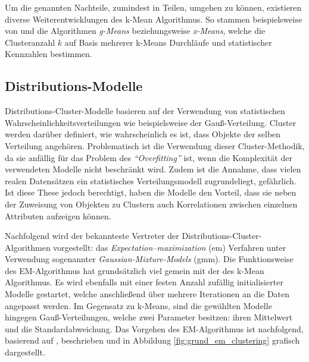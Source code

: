 Um die genannten Nachteile, zumindest in Teilen, umgehen zu können, existieren diverse Weiterentwicklungen des k-Mean
Algorithmus. So stammen beispielsweise von \cite[]{Hamerly} und \cite[]{Pelleg} die Algorithmen \textit{g-Means}
beziehungsweise \textit{x-Means}, welche die Clusteranzahl $k$ auf Basis mehrerer k-Means Durchläufe und
statistischer Kennzahlen bestimmen.

\subsection{Distributions-Modelle}
\label{sec:grund_distribution_clustering}

Distributions-Cluster-Modelle basieren auf der Verwendung von statistischen Wahrscheinlichkeitsverteilungen wie
beispielsweise der Gauß-Verteilung. Cluster werden darüber definiert, wie wahrscheinlich es ist, dass Objekte
der selben Verteilung angehören. Problematisch ist die Verwendung dieser Cluster-Methodik, da sie anfällig für
das Problem des \textit{``Overfitting''} ist, wenn die Komplexität der verwendeten Modelle nicht beschränkt wird.
Zudem ist die Annahme, dass vielen realen Datensätzen ein statistisches Verteilungsmodell zugrundeliegt, gefährlich.
Ist diese These jedoch berechtigt, haben die Modelle den Vorteil, dass sie neben der Zuweisung von Objekten zu Clustern
auch Korrelationen zwischen einzelnen Attributen aufzeigen können. \cite[]{AndersDrachen2014}

Nachfolgend wird der bekannteste Vertreter der Distributions-Cluster-Algorithmen vorgestellt:
das \textit{Expectation–maximization} (\acrshort*{em}) Verfahren unter Verwendung sogenannter \textit{Gaussian-Mixture-Models} (\acrshort*{gmm}).
Die Funktionsweise des EM-Algorithmus hat grundsätzlich viel gemein mit der des k-Mean Algorithmus.
Es wird ebenfalls mit einer festen Anzahl zufällig initialisierter Modelle gestartet, welche anschließend über mehrere Iterationen
an die Daten angepasst werden. Im Gegensatz zu k-Means, sind die gewählten Modelle hingegen Gauß-Verteilungen,
welche zwei Parameter besitzen: ihren Mittelwert und die Standardabweichung.
Das Vorgehen des EM-Algorithmus ist nachfolgend, basierend auf \cite[]{GeorgeSeif2018}, beschrieben und in
Abbildung \ref{fig:grund_em_clustering} grafisch dargestellt.

